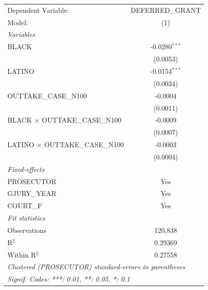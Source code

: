 
\begingroup
\centering
\begin{tabular}{lc}
   \tabularnewline \midrule \midrule
   Dependent Variable:                    & DEFERRED\_GRANT\\   
   Model:                                 & (1)\\  
   \midrule
   \emph{Variables}\\
   BLACK                                  & -0.0280$^{***}$\\   
                                          & (0.0053)\\   
   LATINO                                 & -0.0154$^{***}$\\   
                                          & (0.0034)\\   
   OUTTAKE\_CASE\_N100                    & -0.0004\\   
                                          & (0.0011)\\   
   BLACK $\times$ OUTTAKE\_CASE\_N100     & -0.0009\\   
                                          & (0.0007)\\   
   LATINO $\times$ OUTTAKE\_CASE\_N100    & -0.0003\\   
                                          & (0.0004)\\   
   \midrule
   \emph{Fixed-effects}\\
   PROSECUTOR                             & Yes\\  
   GJURY\_YEAR                            & Yes\\  
   COURT\_F                               & Yes\\  
   \midrule
   \emph{Fit statistics}\\
   Observations                           & 120,838\\  
   R$^2$                                  & 0.29369\\  
   Within R$^2$                           & 0.27558\\  
   \midrule \midrule
   \multicolumn{2}{l}{\emph{Clustered (PROSECUTOR) standard-errors in parentheses}}\\
   \multicolumn{2}{l}{\emph{Signif. Codes: ***: 0.01, **: 0.05, *: 0.1}}\\
\end{tabular}
\par\endgroup


